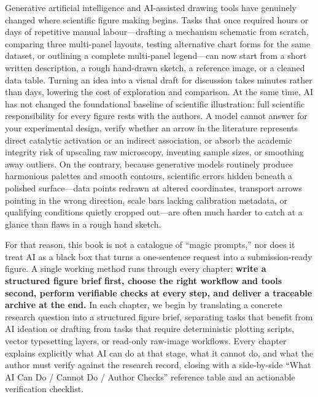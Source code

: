 Generative artificial intelligence and AI-assisted drawing tools have genuinely changed where scientific figure making begins. Tasks that once required hours or days of repetitive manual labour---drafting a mechanism schematic from scratch, comparing three multi-panel layouts, testing alternative chart forms for the same dataset, or outlining a complete multi-panel legend---can now start from a short written description, a rough hand-drawn sketch, a reference image, or a cleaned data table. Turning an idea into a visual draft for discussion takes minutes rather than days, lowering the cost of exploration and comparison. At the same time, AI has not changed the foundational baseline of scientific illustration: full scientific responsibility for every figure rests with the authors. A model cannot answer for your experimental design, verify whether an arrow in the literature represents direct catalytic activation or an indirect association, or absorb the academic integrity risk of upscaling raw microscopy, inventing sample sizes, or smoothing away outliers. On the contrary, because generative models routinely produce harmonious palettes and smooth contours, scientific errors hidden beneath a polished surface---data points redrawn at altered coordinates, transport arrows pointing in the wrong direction, scale bars lacking calibration metadata, or qualifying conditions quietly cropped out---are often much harder to catch at a glance than flaws in a rough hand sketch.

For that reason, this book is not a catalogue of ``magic prompts,'' nor does it treat AI as a black box that turns a one-sentence request into a submission-ready figure. A single working method runs through every chapter: \textbf{write a structured figure brief first, choose the right workflow and tools second, perform verifiable checks at every step, and deliver a traceable archive at the end.} In each chapter, we begin by translating a concrete research question into a structured figure brief, separating tasks that benefit from AI ideation or drafting from tasks that require deterministic plotting scripts, vector typesetting layers, or read-only raw-image workflows. Every chapter explains explicitly what AI can do at that stage, what it cannot do, and what the author must verify against the research record, closing with a side-by-side ``What AI Can Do / Cannot Do / Author Checks'' reference table and an actionable verification checklist.

